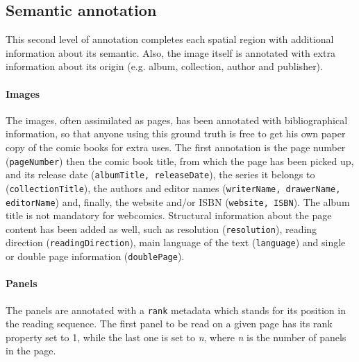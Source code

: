 \subsection{Semantic annotation} %
\label{sub:gt:semantic_annotation}
This second level of annotation completes each spatial region with additional information about its semantic.
Also, the image itself is annotated with extra information about its origin (e.g. album, collection, author and publisher).

\paragraph{Images}
The images, often assimilated as pages, has been annotated with bibliographical information, so that anyone using this ground truth is free to get his own paper copy of the comic books for extra uses.
The first annotation is the page number (\texttt{{pageNumber}}) then the comic book title, from which the page has been picked up, and its release date (\texttt{{albumTitle, releaseDate}}), the series it belongs to (\texttt{{collectionTitle}}), the authors and editor names (\texttt{{writerName, drawerName, editorName}}) and, finally, the website and/or ISBN (\texttt{{website, ISBN}}).
The album title is not mandatory for webcomics.
Structural information about the page content has been added as well, such as resolution (\texttt{{resolution}}), reading direction (\texttt{{readingDirection}}), main language of the text (\texttt{{language}}) and single or double page information (\texttt{{doublePage}}).

\paragraph{Panels} 
The panels are annotated with a \texttt{{rank}} metadata which stands for its position in the reading sequence.
The first panel to be read on a given page has its rank property set to 1, while the last one is set to \textit{n}, where \textit{n} is the number of panels in the page.

